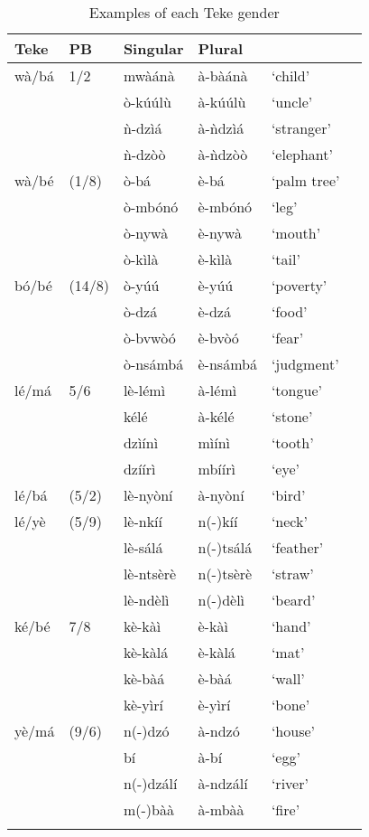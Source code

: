 \documentclass[output=paper,,modfonts,nonflat]{langsci/langscibook}
\begin{document}
\begin{table}[!htbp]
\caption{Examples of each Teke gender}
\label{table5}
\begin{small}	
\begin{tabular}{l		l		l		l		l		l}
  \lsptoprule
Teke	&	PB	&	Singular	&	Plural	&		\\	
\midrule
wà/bá	&	1/2	&	mwàánà	&	à-bàánà	&	`child’	\\	
	&		&	ò-kúúlù	&	à-kúúlù	&	`uncle’	\\	
	&		&	ǹ-dzìá	&	à-ǹdzìá	&	`stranger’	\\	
	&		&	ǹ-dzòò	&	à-ǹdzòò	&	`elephant’	\\	[0.2cm]
wà/bé	&	(1/8)	&	ò-bá	&	è-bá	&	`palm tree’	\\	
	&		&	ò-mbónó	&	è-mbónó	&	`leg’	\\	
	&		&	ò-nywà	&	è-nywà	&	`mouth’	\\	
	&		&	ò-kìlà	&	è-kìlà	&	`tail’	\\	[0.2cm]
bó/bé	&	(14/8)	&	ò-yúú	&	è-yúú	&	`poverty’	\\	
	&		&	ò-dzá	&	è-dzá	&	`food’	\\	
	&		&	ò-bvwòó	&	è-bvòó	&	`fear’	\\	
	&		&	ò-nsámbá	&	è-nsámbá	&	`judgment’	\\	[0.2cm]
lé/má\footnotemark	&	5/6	&	lè-lémì	&	à-lémì	&	`tongue’	\\	
	&		&	kélé	&	à-kélé	&	`stone’	\\	
	&		&	dzìínì	&	mìínì	&	`tooth’	\\
	&		&	dzíírì	&	mbíírì	&	`eye’	\\	[0.2cm]
lé/bá	&	(5/2)	&	lè-nyòní	&	à-nyòní	&	`bird’	\\	[0.2cm]
lé/yè	&	(5/9)	&	lè-nkíí	&	n(-)kíí	&	`neck’	\\	
	&		&	lè-sálá	&	n(-)tsálá	&	`feather’	\\	
	&		&	lè-ntsèrè	&	n(-)tsèrè	&	`straw’	\\	
	&		&	lè-ndèlì	&	n(-)dèlì	&	`beard’	\\	[0.2cm]
ké/bé	&	7/8	&	kè-kàì	&	è-kàì	&	`hand’	\\	
	&		&	kè-kàlá	&	è-kàlá	&	`mat’	\\	
	&		&	kè-bàá	&	è-bàá	&	`wall’	\\	
	&		&	kè-yìrí	&	è-yìrí	&	`bone’	\\	[0.2cm]
yè/má	&	(9/6)	&	n(-)dzó	&	à-ndzó	&	`house’	\\	
	&		&	bí	&	à-bí	&	`egg’	\\	
	&		&	n(-)dzálí	&	à-ndzálí	&	`river’	\\	
	&		&	m(-)bàà	&	à-mbàà	&	`fire’	\\	
  \lspbottomrule
\end{tabular}
\end{small}	
\end{table}
\end{document}
